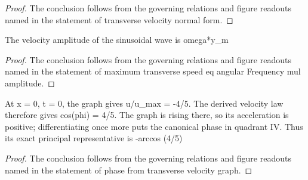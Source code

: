 \begin{proof}
  The conclusion follows from the governing relations and figure readouts named in the statement of transverse velocity normal form.
\end{proof}
\begin{lemma}
  \label{lem:physics:phyx-mini-0288:phyxminiproblems-problemphyxmini0288-maximum-transverse-speed-eq-angularfrequency-mul-amplitude}
  The velocity amplitude of the sinusoidal wave is omega*y\_m
\end{lemma}
\begin{proof}
  The conclusion follows from the governing relations and figure readouts named in the statement of maximum transverse speed eq angular Frequency mul amplitude.
\end{proof}
\begin{lemma}
  \label{lem:physics:phyx-mini-0288:phyxminiproblems-problemphyxmini0288-phase-from-transverse-velocity-graph}
  At x = 0, t = 0, the graph gives u/u\_max = -4/5. The derived velocity law therefore gives cos(phi) = 4/5. The graph is rising there, so its acceleration is positive; differentiating once more puts the canonical phase in quadrant IV. Thus its exact principal representative is -arccos (4/5)
\end{lemma}
\begin{proof}
  The conclusion follows from the governing relations and figure readouts named in the statement of phase from transverse velocity graph.
\end{proof}
